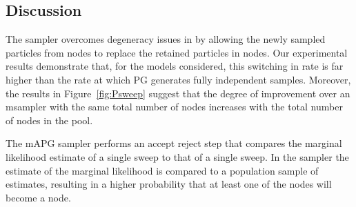 
\subsection{Discussion}
\label{sec:discussion}

The \ipmcmc sampler overcomes degeneracy issues in \pg by allowing the newly sampled particles from \smc nodes to replace the retained particles in \csmc nodes. Our experimental results demonstrate that, for the models considered, this switching in rate is far higher than the rate at which PG generates fully independent samples. Moreover, the results in Figure~\ref{fig:Psweep} suggest that the degree of improvement over an m\pg sampler with the same total number of nodes increases with the total number of nodes in the pool. 

The mAPG sampler performs an accept reject step that compares the marginal likelihood estimate of a single \csmc sweep to that of a single \smc sweep. In the \ipmcmc sampler the \csmc estimate of the marginal likelihood is compared to a population sample of \smc estimates, resulting in a higher probability that at least one of the \smc nodes will become a \csmc node.




